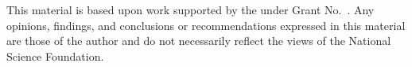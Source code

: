 \documentclass[sigplan,10pt,review,anonymous,table]{acmart}\settopmatter{printfolios=true,printccs=false,printacmref=false}
\begin{document}








\begin{acks}                            %
  This material is based upon work supported by the
   under Grant
  No.~.  Any opinions, findings, and
  conclusions or recommendations expressed in this material are those
  of the author and do not necessarily reflect the views of the
  National Science Foundation.
\end{acks}


%



 
\end{document}
